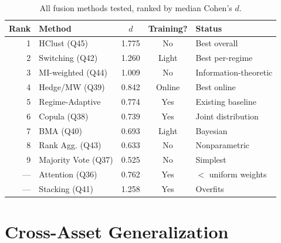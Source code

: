 \documentclass[11pt,a4paper]{article}
\begin{document}
\begin{table}[H]
\centering
\caption{All fusion methods tested, ranked by median Cohen's $d$.}
\begin{tabular}{@{}rlccl@{}}
\toprule
\textbf{Rank} & \textbf{Method} & \textbf{$d$} & \textbf{Training?} & \textbf{Status} \\
\midrule
1 & HClust (Q45) & 1.775 & No & \cellcolor{keepgreen!30}Best overall \\
2 & Switching (Q42) & 1.260 & Light & \cellcolor{keepgreen!30}Best per-regime \\
3 & MI-weighted (Q44) & 1.009 & No & \cellcolor{keepgreen!30}Information-theoretic \\
4 & Hedge/MW (Q39) & 0.842 & Online & \cellcolor{keepgreen!30}Best online \\
5 & Regime-Adaptive & 0.774 & Yes & Existing baseline \\
6 & Copula (Q38) & 0.739 & Yes & \cellcolor{keepgreen!30}Joint distribution \\
7 & BMA (Q40) & 0.693 & Light & \cellcolor{keepgreen!30}Bayesian \\
8 & Rank Agg. (Q43) & 0.633 & No & \cellcolor{keepgreen!30}Nonparametric \\
9 & Majority Vote (Q37) & 0.525 & No & \cellcolor{keepgreen!30}Simplest \\
\midrule
--- & Attention (Q36) & 0.762 & Yes & \cellcolor{rejectred!30}$<$ uniform weights \\
--- & Stacking (Q41) & 1.258 & Yes & \cellcolor{rejectred!30}Overfits \\
\bottomrule
\end{tabular}
\end{table}

\section{Cross-Asset Generalization}
\end{document}
